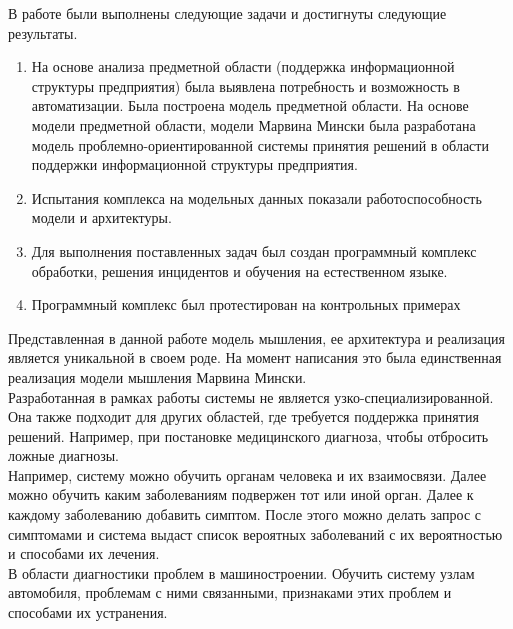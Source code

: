 
В работе были выполнены следующие задачи и достигнуты следующие результаты.
\begin{enumerate}
  \item На основе анализа предметной области (поддержка информационной структуры предприятия) была выявлена потребность и возможность в автоматизации. Была построена модель предметной области. На основе модели предметной области, модели Марвина Мински была разработана модель проблемно-ориентированной системы принятия решений в области поддержки информационной структуры предприятия.  
  \item Испытания комплекса на модельных данных показали работоспособность модели и архитектуры.  
  \item Для выполнения поставленных задач был создан программный комплекс обработки, решения инцидентов и обучения на естественном языке. 
  \item Программный комплекс был протестирован на контрольных примерах
\end{enumerate}

Представленная в данной работе модель мышления, ее архитектура и реализация является уникальной в своем роде. На момент написания это была единственная реализация модели мышления Марвина Мински. \\
Разработанная в рамках работы системы не является узко-специализированной. Она также подходит для других областей, где требуется поддержка принятия решений. Например, при постановке медицинского диагноза, чтобы отбросить ложные диагнозы. \\
Например, систему можно обучить органам человека и их взаимосвязи. Далее можно обучить каким заболеваниям подвержен тот или иной орган. Далее к каждому заболеванию добавить симптом. После этого можно делать запрос с симптомами и система выдаст список вероятных заболеваний с их вероятностью и способами их лечения. \\
В области диагностики проблем в машиностроении. Обучить систему узлам автомобиля, проблемам с ними связанными, признаками этих проблем и способами их устранения. 



